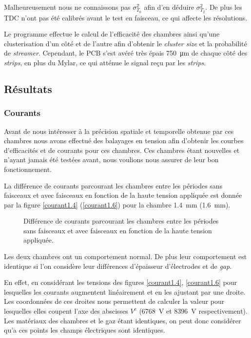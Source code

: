 Malheureusement nous ne connaissons pas $\sigma_{T_0}^2$ afin d'en déduire $\sigma_{T_2}^2$. De plus les TDC n'ont pas été calibrés avant le test en faisceau, ce qui affecte les résolutions.

Le programme effectue le calcul de l'efficacité des chambres ainsi  qu'une clusterisation d'un côté et de l'autre afin d'obtenir le \textit{cluster size} et la probabilité de \textit{streamer}. Cependant, le PCB s'est avéré très épais \SI{750}{\micro\meter} de chaque côté des \textit{strips}, en plus du Mylar, ce qui atténue le signal reçu par les \textit{strips}.

\subsection{Résultats}


\subsubsection{Courants}
Avant de nous intéresser à la précision spatiale et temporelle obtenue par ces chambres nous avons effectué des balayages en tension afin d'obtenir les courbes d'efficacités et de courants pour ces chambres. Ces chambres étant nouvelles et n'ayant jamais été testées avant, nous voulions nous assurer de leur bon fonctionnement.

La différence de courants parcourant les chambres entre les périodes sans faisceaux et avec faisceaux en fonction de la haute tension appliquée est donnée par la figure \ref{courant1.4} (\ref{courant1.6}) pour la chambre \SI{1.4}{\milli\meter} (\SI{1.6}{\milli\meter}).

\begin{figure}[ht!]
	\vspace{-0.5cm}
	\centering
	\caption{Différence de courants parcourant les chambres entre les périodes sans faisceaux et avec faisceaux en fonction de la haute tension appliquée.}
	\label{courant1.41.6}
\end{figure}

Les deux chambres ont un comportement normal. De plus leur comportement est identique si l'on considère leur différences d'épaisseur d'électrodes et de \textit{gap}.

En effet, en considérant les tensions des figures \ref{courant1.4}, \ref{courant1.6} pour lesquelles les courants augmentent linéairement et en les ajustant par une droite. Les coordonnées de ces droites nous permettent de calculer la valeur pour lesquelles elles coupent l'axe des abscisses $V^c$ (\SI{6768}{\volt} et \SI{8396}{\volt} respectivement). Les matériaux des chambres et le gaz étant identiques, on peut donc considérer qu'a ces points les champs électriques sont identiques.

